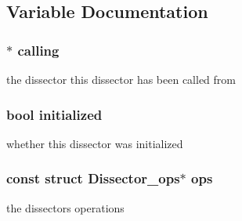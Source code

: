 \subsection{Variable Documentation}
\hypertarget{_dissector-int_8h_a2f297b2d3abad7c440c176d51e011f38}{}
\subsubsection[{calling}]{$\ast$ calling}\label{_dissector-int_8h_a2f297b2d3abad7c440c176d51e011f38}
the dissector this dissector has been called from \hypertarget{_dissector-int_8h_aedeffc7d23da25d52b9a50045189fe2b}{}
\subsubsection[{initialized}]{\setlength{\rightskip}{0pt plus 5cm}bool initialized}\label{_dissector-int_8h_aedeffc7d23da25d52b9a50045189fe2b}
whether this dissector was initialized \hypertarget{_dissector-int_8h_aa1af82d23bc82742dafc141b0f4d5229}{}
\subsubsection[{ops}]{\setlength{\rightskip}{0pt plus 5cm}const struct {\bf Dissector\+\_\+ops}$\ast$ ops}\label{_dissector-int_8h_aa1af82d23bc82742dafc141b0f4d5229}
the dissectors operations 